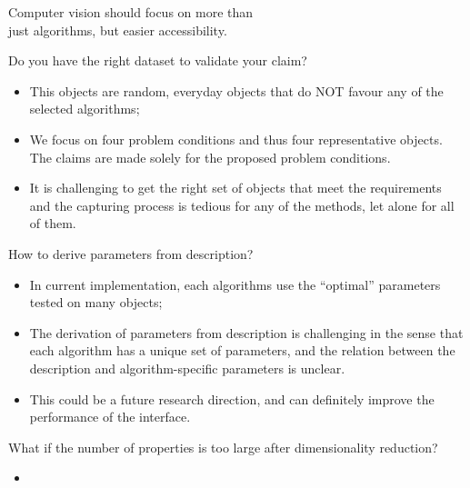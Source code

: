 \documentclass[10pt]{beamer}
\begin{document}
\begin{frame}[standout]

Computer vision should focus on more than \\just algorithms, but easier accessibility.

\end{frame}

\appendix
\begin{frame}

\begin{alertblock}{Do you have the right dataset to validate your claim?}
\begin{itemize}
\item This objects are random, everyday objects that do NOT favour any of the selected algorithms;
\item We focus on four problem conditions and thus four representative objects. The claims are made solely for the proposed problem conditions.
\item It is challenging to get the right set of objects that meet the requirements and the capturing process is tedious for any of the methods, let alone for all of them.
\end{itemize}
\end{alertblock}

\end{frame}

\begin{frame}

\begin{alertblock}{How to derive parameters from description?}
\begin{itemize}
\item In current implementation, each algorithms use the ``optimal'' parameters tested on many objects;
\item The derivation of parameters from description is challenging in the sense that each algorithm has a unique set of parameters, and the relation between the description and algorithm-specific parameters is unclear.
\item This could be a future research direction, and can definitely improve the performance of the interface.
\end{itemize}
\end{alertblock}

\end{frame}

\begin{frame}

\begin{alertblock}{What if the number of properties is too large after dimensionality reduction?}
\begin{itemize}
\item 
\end{itemize}
\end{alertblock}

\end{frame}
\end{document}
